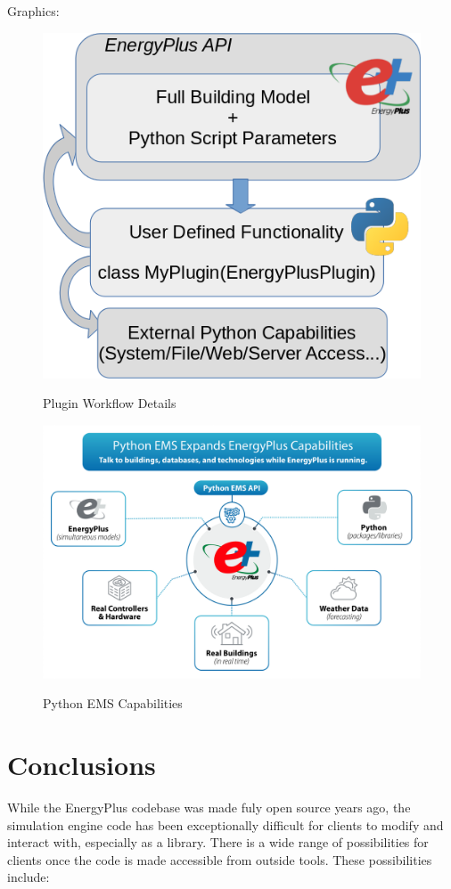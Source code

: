 \documentclass[5p]{elsarticle}
\begin{document}
Graphics:

\begin{figure}
\begin{center}
\label{figure:plugins:plugin_workflow_cropped}
\includegraphics[width=0.7\columnwidth]{images/plugin_workflow.png}
\caption{Plugin Workflow Details}
\end{center}
\end{figure}

\begin{figure}
\begin{center}
\label{figure:plugins:python_ems}
\includegraphics[width=\columnwidth]{images/python_ems.png}
\caption{Python EMS Capabilities}
\end{center}
\end{figure}

 \section{Conclusions}
While the EnergyPlus codebase was made fuly open source years ago, the simulation engine code has been exceptionally difficult for clients to modify and interact with, especially as a library.  There is a wide range of possibilities for clients once the code is made accessible from outside tools.  These possibilities include:
\end{document}
